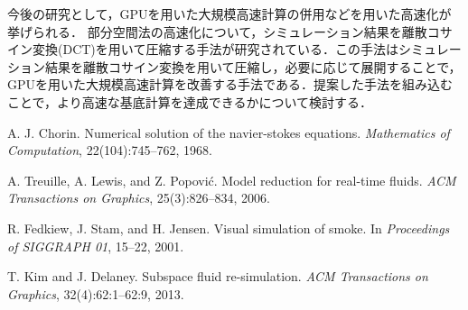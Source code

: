 \documentclass[uplatex,dvipdfmx,10pt,a4paper,notitlepage,oneside,twocolumn]{abst_jsarticle}
\begin{document}
今後の研究として，GPUを用いた大規模高速計算の併用などを用いた高速化が挙げられる．
部分空間法の高速化について，シミュレーション結果を離散コサイン変換(DCT)を用いて圧縮する手法が研究されている．この手法はシミュレーション結果を離散コサイン変換を用いて圧縮し，必要に応じて展開することで，GPUを用いた大規模高速計算を改善する手法である．提案した手法を組み込むことで，より高速な基底計算を達成できるかについて検討する．
\begin{thebibliography}{99}

A. J. Chorin. Numerical solution of the navier-stokes equations. \textit{Mathematics of Computation}, 22(104):745--762, 1968.

A. Treuille, A. Lewis, and Z. Popovi\'{c}. Model reduction for real-time fluids. \textit{ACM Transactions on Graphics}, 25(3):826--834, 2006.

R. Fedkiew, J. Stam, and H. Jensen. Visual simulation of smoke. In \textit{Proceedings of SIGGRAPH 01}, 15--22, 2001.

T. Kim and J. Delaney. Subspace fluid re-simulation. \textit{ACM Transactions on Graphics}, 32(4):62:1--62:9, 2013.

\end{thebibliography}
\end{document}
